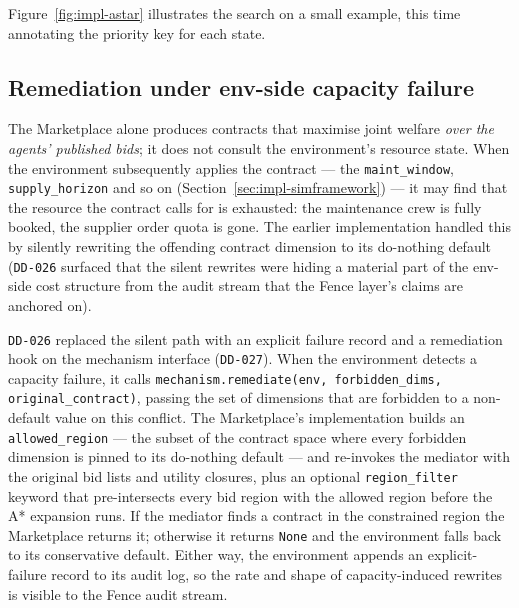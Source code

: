 Figure~\ref{fig:impl-astar} illustrates the search on a small example,
this time annotating the priority key for each state.


\subsection{Remediation under env-side capacity failure}
\label{subsec:impl-remediation}

The Marketplace alone produces contracts that maximise joint welfare
\emph{over the agents' published bids}; it does not consult the
environment's resource state. When the environment subsequently applies
the contract --- the \texttt{maint\_window}, \texttt{supply\_horizon}
and so on (Section~\ref{sec:impl-simframework}) --- it may find that
the resource the contract calls for is exhausted: the maintenance crew
is fully booked, the supplier order quota is gone. The earlier
implementation handled this by silently rewriting the offending contract
dimension to its do-nothing default (\texttt{DD-026} surfaced that the
silent rewrites were hiding a material part of the env-side cost
structure from the audit stream that the Fence layer's claims are
anchored on).

\texttt{DD-026} replaced the silent path with an explicit failure
record and a remediation hook on the mechanism interface
(\texttt{DD-027}). When the environment detects a capacity failure, it
calls \texttt{mechanism.remediate(env, forbidden\_dims, original\_contract)},
passing the set of dimensions that are forbidden to a non-default value
on this conflict. The Marketplace's implementation builds an
\texttt{allowed\_region} --- the subset of the contract space where
every forbidden dimension is pinned to its do-nothing default --- and
re-invokes the mediator with the original bid lists and utility
closures, plus an optional \texttt{region\_filter} keyword that
pre-intersects every bid region with the allowed region before the A*
expansion runs. If the mediator finds a contract in the constrained
region the Marketplace returns it; otherwise it returns \texttt{None}
and the environment falls back to its conservative default. Either way,
the environment appends an explicit-failure record to its audit log, so
the rate and shape of capacity-induced rewrites is visible to the Fence
audit stream.


